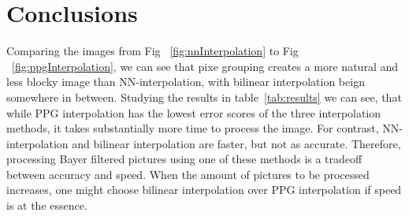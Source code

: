 \section{Conclusions}
Comparing the images from Fig ~\ref{fig:nnInterpolation} to Fig ~\ref{fig:ppgInterpolation}, we can see that pixe grouping creates a more natural and less blocky image than NN-interpolation, with bilinear interpolation beign somewhere in between. Studying the results in table~\ref{tab:results} we can see, that while PPG interpolation has the lowest error scores of the three interpolation methods, it takes substantially more time to process the image. For contrast, NN-interpolation and bilinear interpolation are faster, but not as accurate. Therefore, processing Bayer filtered pictures using one of these methods is a tradeoff between accuracy and speed. When the amount of pictures to be processed increases, one might choose bilinear interpolation over PPG interpolation if speed is at the essence.